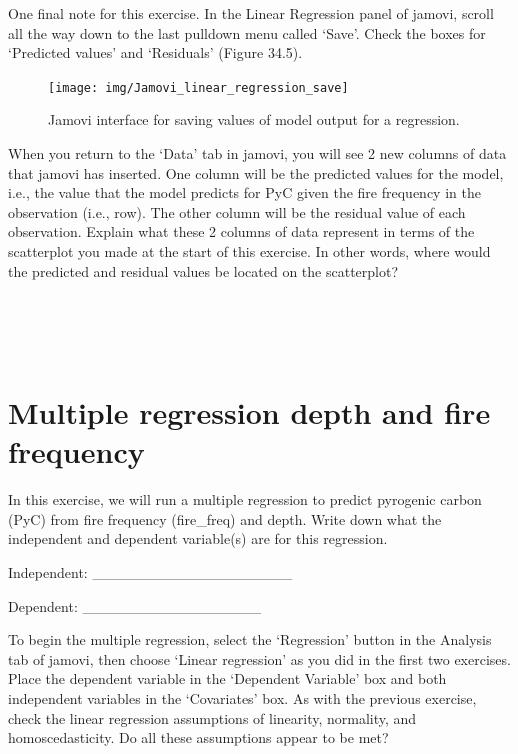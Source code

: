 \documentclass[
]{scrbook}
\begin{document}
One final note for this exercise.
In the Linear Regression panel of jamovi, scroll all the way down to the last pulldown menu called `Save'.
Check the boxes for `Predicted values' and `Residuals' (Figure 34.5).

\begin{figure}
\texttt{[image: img/Jamovi\_linear\_regression\_save]} \caption{Jamovi interface for saving values of model output for a regression.}\label{fig:unnamed-chunk-180}
\end{figure}

When you return to the `Data' tab in jamovi, you will see 2 new columns of data that jamovi has inserted.
One column will be the predicted values for the model, i.e., the value that the model predicts for PyC given the fire frequency in the observation (i.e., row).
The other column will be the residual value of each observation.
Explain what these 2 columns of data represent in terms of the scatterplot you made at the start of this exercise.
In other words, where would the predicted and residual values be located on the scatterplot?

\begin{verbatim}




\end{verbatim}

\hypertarget{multiple-regression-depth-and-fire-frequency}{%
\section{Multiple regression depth and fire frequency}\label{multiple-regression-depth-and-fire-frequency}}

In this exercise, we will run a multiple regression to predict pyrogenic carbon (PyC) from fire frequency (fire\_freq) and depth.
Write down what the independent and dependent variable(s) are for this regression.

Independent: \_\_\_\_\_\_\_\_\_\_\_\_\_\_\_\_\_\_\_

Dependent: \_\_\_\_\_\_\_\_\_\_\_\_\_\_\_\_\_

To begin the multiple regression, select the `Regression' button in the Analysis tab of jamovi, then choose `Linear regression' as you did in the first two exercises.
Place the dependent variable in the `Dependent Variable' box and both independent variables in the `Covariates' box.
As with the previous exercise, check the linear regression assumptions of linearity, normality, and homoscedasticity.
Do all these assumptions appear to be met?
\end{document}
